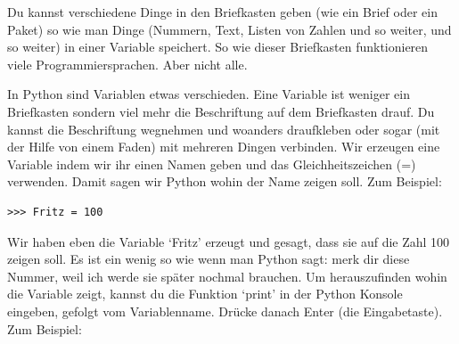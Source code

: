 Du kannst verschiedene Dinge in den Briefkasten geben (wie ein Brief oder ein Paket) so wie man Dinge (Nummern, Text, Listen von Zahlen und so weiter, und so weiter) in einer Variable speichert. So wie dieser Briefkasten funktionieren viele Programmiersprachen. Aber nicht alle.

In Python sind Variablen etwas verschieden. Eine Variable ist weniger ein Briefkasten sondern viel mehr die Beschriftung auf dem Briefkasten drauf. Du kannst die Beschriftung wegnehmen und woanders draufkleben oder sogar (mit der Hilfe von einem Faden) mit mehreren Dingen verbinden. Wir erzeugen eine Variable indem wir ihr einen Namen geben und das Gleichheitszeichen (=) verwenden. Damit sagen wir Python wohin der Name zeigen soll. Zum Beispiel:

\begin{Verbatim}[frame=single]
>>> Fritz = 100
\end{Verbatim}

Wir haben eben die Variable `Fritz' erzeugt und gesagt, dass sie auf die Zahl 100 zeigen soll. Es ist ein wenig so wie wenn man Python sagt: merk dir diese Nummer, weil ich werde sie später nochmal brauchen. Um herauszufinden wohin die Variable zeigt, kannst du die Funktion `print' in der Python Konsole eingeben, gefolgt vom Variablenname. Drücke danach Enter (die Eingabetaste). Zum Beispiel:

